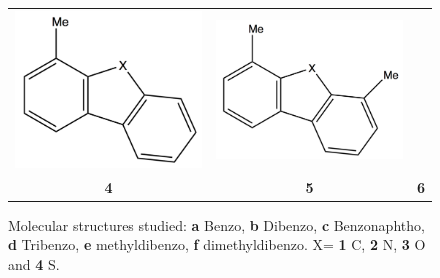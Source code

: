 \begin{figure}[H]
\begin{center}
\begin{tabular}{c c c}
				\includegraphics[scale=0.13]{image/methyl-benzo} & \includegraphics[scale=0.13]{image/dimethyl-benzo} \\
				\textbf{4} & \textbf{5} & \textbf{6}\\
			\end{tabular}
		\end{center}
		\caption{Molecular structures studied: \textbf{a} Benzo, \textbf{b} Dibenzo, \textbf{c} Benzonaphtho, \textbf{d} Tribenzo, \textbf{e} methyldibenzo, \textbf{f} dimethyldibenzo. X= \textbf{1} C, \textbf{2} N, \textbf{3} O and \textbf{4} S.}
	\end{figure}
	
